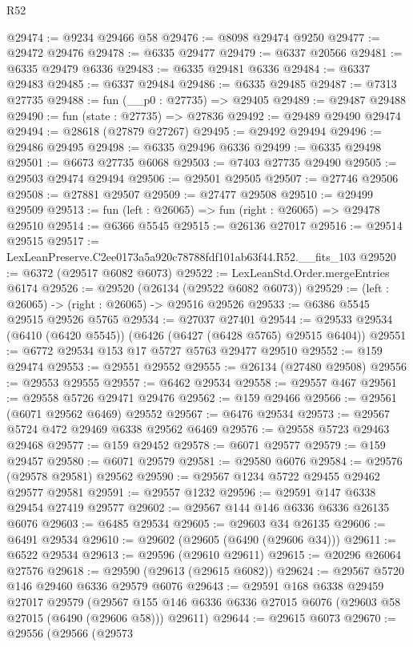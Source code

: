 \begin{lexlean}{R52}
\begin{coremodule}
@29474 := @9234 @29466 @58
@29476 := @8098 @29474 @9250
@29477 := @29472 @29476
@29478 := @6335 @29477
@29479 := @6337 @20566
@29481 := @6335 @29479 @6336
@29483 := @6335 @29481 @6336
@29484 := @6337 @29483
@29485 := @6337 @29484
@29486 := @6335 @29485
@29487 := @7313 @27735
@29488 := fun (__p0 : @27735) => @29405
@29489 := @29487 @29488
@29490 := fun (state : @27735) => @27836
@29492 := @29489 @29490 @29474
@29494 := @28618 (@27879 @27267)
@29495 := @29492 @29494
@29496 := @29486 @29495
@29498 := @6335 @29496 @6336
@29499 := @6335 @29498
@29501 := @6673 @27735 @6068
@29503 := @7403 @27735 @29490
@29505 := @29503 @29474 @29494
@29506 := @29501 @29505
@29507 := @27746 @29506
@29508 := @27881 @29507
@29509 := @27477 @29508
@29510 := @29499 @29509
@29513 := fun (left : @26065) => fun (right : @26065) => @29478 @29510
@29514 := @6366 @5545
@29515 := @26136 @27017
@29516 := @29514 @29515
@29517 := LexLeanPreserve.C2ee0173a5a920c78788fdf101ab63f44.R52.__fits_103
@29520 := @6372 (@29517 @6082 @6073)
@29522 := LexLeanStd.Order.mergeEntries @6174
@29526 := @29520 (@26134 (@29522 @6082 @6073))
@29529 := (left : @26065) -> (right : @26065) -> @29516 @29526
@29533 := @6386 @5545 @29515 @29526 @5765
@29534 := @27037 @27401
@29544 := @29533 @29534 (@6410 (@6420 @5545)) (@6426 (@6427 (@6428 @5765) @29515 @6404))
@29551 := @6772 @29534 @153 @17 @5727 @5763 @29477 @29510
@29552 := @159 @29474
@29553 := @29551 @29552
@29555 := @26134 (@27480 @29508)
@29556 := @29553 @29555
@29557 := @6462 @29534
@29558 := @29557 @467
@29561 := @29558 @5726 @29471 @29476
@29562 := @159 @29466
@29566 := @29561 (@6071 @29562 @6469) @29552
@29567 := @6476 @29534
@29573 := @29567 @5724 @472 @29469 @6338 @29562 @6469
@29576 := @29558 @5723 @29463 @29468
@29577 := @159 @29452
@29578 := @6071 @29577
@29579 := @159 @29457
@29580 := @6071 @29579
@29581 := @29580 @6076
@29584 := @29576 (@29578 @29581) @29562
@29590 := @29567 @1234 @5722 @29455 @29462 @29577 @29581
@29591 := @29557 @1232
@29596 := @29591 @147 @6338 @29454 @27419 @29577
@29602 := @29567 @144 @146 @6336 @6336 @26135 @6076
@29603 := @6485 @29534
@29605 := @29603 @34 @26135
@29606 := @6491 @29534
@29610 := @29602 (@29605 (@6490 (@29606 @34)))
@29611 := @6522 @29534
@29613 := @29596 (@29610 @29611)
@29615 := @20296 @26064 @27576
@29618 := @29590 (@29613 (@29615 @6082))
@29624 := @29567 @5720 @146 @29460 @6336 @29579 @6076
@29643 := @29591
    @168
    @6338
    @29459
    @27017
    @29579
    (@29567 @155 @146 @6336 @6336 @27015 @6076 (@29603 @58 @27015 (@6490 (@29606 @58))) @29611)
@29644 := @29615 @6073
@29670 := @29556
    (@29566
      (@29573

\end{coremodule}
\end{lexlean}
